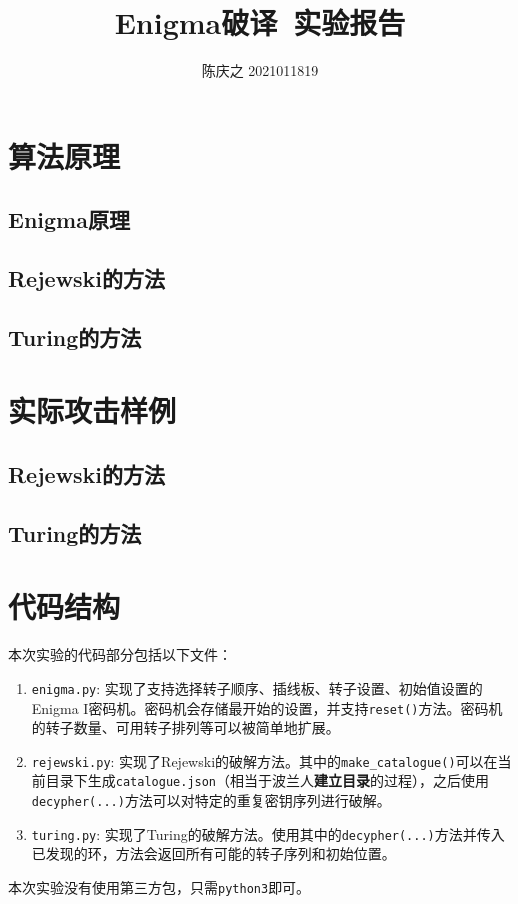 \documentclass[a4paper,12pt]{article}
\title{Enigma破译\ 实验报告}
\author{陈庆之 2021011819}
\begin{document}
	
	\maketitle
	
	\section{算法原理}
	\subsection{Enigma原理}
	
	\subsection{Rejewski的方法}
	
	\subsection{Turing的方法}
	
	\section{实际攻击样例}
	
	\subsection{Rejewski的方法}
	
	
	
	\subsection{Turing的方法}
	
	\section{代码结构}
	
	本次实验的代码部分包括以下文件：
	\begin{enumerate}
		\item \texttt{enigma.py}: 实现了支持选择转子顺序、插线板、转子设置、初始值设置的Enigma I密码机。密码机会存储最开始的设置，并支持\texttt{reset()}方法。密码机的转子数量、可用转子排列等可以被简单地扩展。
		
		\item \texttt{rejewski.py}: 实现了Rejewski的破解方法。其中的\texttt{make\_catalogue()}可以在当前目录下生成\texttt{catalogue.json}（相当于波兰人\textbf{建立目录}的过程），之后使用\texttt{decypher(...)}方法可以对特定的重复密钥序列进行破解。
		
		\item \texttt{turing.py}: 实现了Turing的破解方法。使用其中的\texttt{decypher(...)}方法并传入已发现的环，方法会返回所有可能的转子序列和初始位置。
	\end{enumerate}
	
	本次实验没有使用第三方包，只需\texttt{python3}即可。
	
\end{document}
